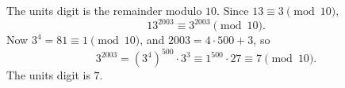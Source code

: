 The units digit is the remainder modulo $10$. Since $13\equiv3\pmod{10}$,
\[
13^{2003}\equiv3^{2003}\pmod{10}.
\]
Now $3^4=81\equiv1\pmod{10}$, and $2003=4\cdot500+3$, so
\[
3^{2003}=\left(3^4\right)^{500}\cdot3^3\equiv1^{500}\cdot27\equiv7\pmod{10}.
\]
The units digit is $\boxed{7}$.
